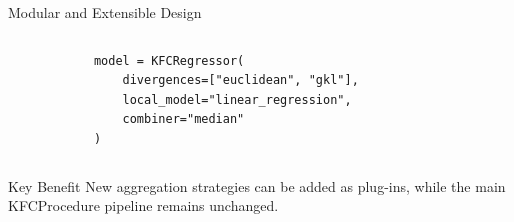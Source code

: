 \begin{frame}[fragile,t]{Modular and Extensible Design}
\begin{columns}[T,onlytextwidth]
\begin{verbatim}
            model = KFCRegressor(
                divergences=["euclidean", "gkl"],
                local_model="linear_regression",
                combiner="median"
            )
        \end{verbatim}

    \end{columns}

    \vspace{0.12cm}

    \begin{block}{Key Benefit}
        \scriptsize
        New aggregation strategies can be added as plug-ins, while the main KFCProcedure pipeline remains unchanged.
    \end{block}

\end{frame}